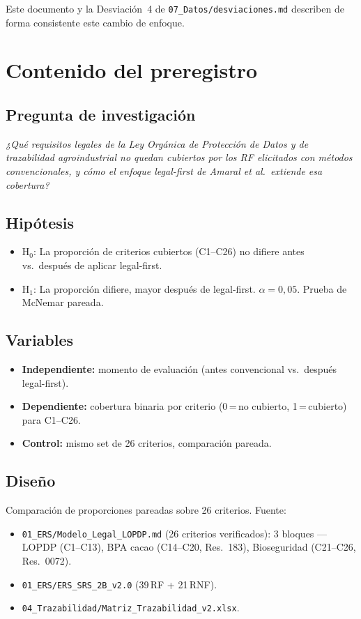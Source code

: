 \documentclass[11pt,a4paper]{article}
\begin{document}
Este documento y la Desviaci\'{o}n~4 de \texttt{07\_Datos/desviaciones.md}
describen de forma consistente este cambio de enfoque.

\section*{Contenido del preregistro}

\subsection*{Pregunta de investigaci\'{o}n}
\textit{¿Qu\'{e} requisitos legales de la Ley Org\'{a}nica de Protecci\'{o}n
de Datos y de trazabilidad agroindustrial no quedan cubiertos por los RF
elicitados con m\'{e}todos convencionales, y c\'{o}mo el enfoque legal-first de
Amaral et al.\ extiende esa cobertura?}

\subsection*{Hip\'{o}tesis}
\begin{itemize}[nosep]
  \item H$_0$: La proporci\'{o}n de criterios cubiertos (C1--C26) no difiere
        antes vs.\ despu\'{e}s de aplicar legal-first.
  \item H$_1$: La proporci\'{o}n difiere, mayor despu\'{e}s de legal-first.
        $\alpha = 0{,}05$. Prueba de McNemar pareada.
\end{itemize}

\subsection*{Variables}
\begin{itemize}[nosep]
  \item \textbf{Independiente:} momento de evaluaci\'{o}n (antes convencional
        vs.\ despu\'{e}s legal-first).
  \item \textbf{Dependiente:} cobertura binaria por criterio (0\,=\,no cubierto,
        1\,=\,cubierto) para C1--C26.
  \item \textbf{Control:} mismo set de 26 criterios, comparaci\'{o}n pareada.
\end{itemize}

\subsection*{Dise\~{n}o}
Comparaci\'{o}n de proporciones pareadas sobre 26 criterios. Fuente:
\begin{itemize}[nosep]
  \item \texttt{01\_ERS/Modelo\_Legal\_LOPDP.md} (26 criterios verificados):
        3 bloques --- LOPDP (C1--C13), BPA cacao (C14--C20, Res.\ 183),
        Bioseguridad (C21--C26, Res.\ 0072).
  \item \texttt{01\_ERS/ERS\_SRS\_2B\_v2.0} (39\,RF + 21\,RNF).
  \item \texttt{04\_Trazabilidad/Matriz\_Trazabilidad\_v2.xlsx}.
\end{itemize}
\end{document}
